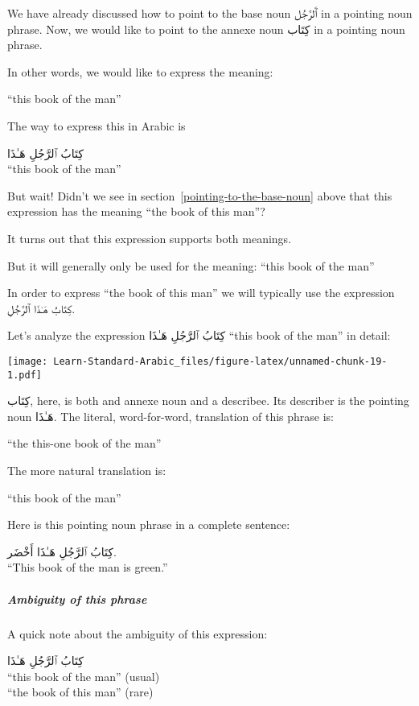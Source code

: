 \documentclass[
  10pt,
]{book}
\begin{document}
We have already discussed how to point to the base noun
\foreignlanguage{arabic}{ٱَلرَّجُل}
in a pointing noun phrase.
Now, we would like to point to the annexe noun
\foreignlanguage{arabic}{کِتَاب}
in a pointing noun phrase.

In other words, we would like to express the meaning:

\enquote{this book of the man}

The way to express this in Arabic is

\foreignlanguage{arabic}{کِتَابُ ٱلرَّجُلِ هَـٰذَا}\\
\enquote{this book of the man}

But wait! Didn't we see in section~\ref{pointing-to-the-base-noun} above that this expression has the meaning
\enquote{the book of this man}?

It turns out that this expression supports both meanings.

But it will generally only be used for the meaning: \enquote{this book of the man}

In order to express
\enquote{the book of this man}
we will typically use the expression \foreignlanguage{arabic}{کِتَابُ هَـٰذَا ٱلرَّجُلِ}.

Let's analyze the expression
\foreignlanguage{arabic}{کِتَابُ ٱلرَّجُلِ هَـٰذَا}
\enquote{this book of the man}
in detail:

\texttt{[image: Learn-Standard-Arabic\_files/figure-latex/unnamed-chunk-19-1.pdf]}

\foreignlanguage{arabic}{کِتَاب}, here, is both and annexe noun and a describee.
Its describer is the pointing noun
\foreignlanguage{arabic}{هَـٰذَا}.
The literal, word-for-word, translation of this phrase is:

\enquote{the this-one book of the man}

The more natural translation is:

\enquote{this book of the man}

Here is this pointing noun phrase in a complete sentence:

\foreignlanguage{arabic}{کِتَابُ ٱلرَّجُلِ هَـٰذَا أَخْضَر.}\\
\enquote{This book of the man is green.}

\subparagraph*{Ambiguity of this phrase}\label{ambiguity-of-this-phrase}

A quick note about the ambiguity of this expression:

\foreignlanguage{arabic}{کِتَابُ ٱلرَّجُلِ هَـٰذَا}\\
\enquote{this book of the man} (usual)\\
\enquote{the book of this man} (rare)
\end{document}
